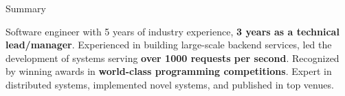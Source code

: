 \documentclass[
	10pt, %
]{resume} %
\begin{document}

\begin{rSection}{Summary}

  Software engineer with 5 years of industry experience, \textbf{3 years as a technical
  lead/manager}. Experienced in building large-scale backend services,
  led the development of systems serving \textbf{over 1000 requests per second}. Recognized by winning
  awards in \textbf{world-class programming competitions}. Expert in distributed systems,
  implemented novel systems, and published in top venues.

\end{rSection}

\end{document}
